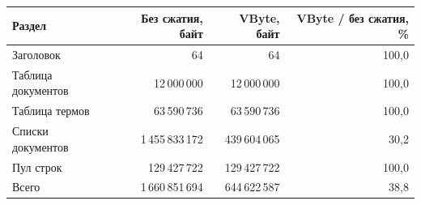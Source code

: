\begin{tabular}{|l|r|r|r|}
\hline
Раздел & Без сжатия, байт & VByte, байт & VByte / без сжатия, \% \\
\hline
Заголовок & 64 & 64 & 100,0 \\
\hline
Таблица документов & 12\,000\,000 & 12\,000\,000 & 100,0 \\
\hline
Таблица термов & 63\,590\,736 & 63\,590\,736 & 100,0 \\
\hline
Списки документов & 1\,455\,833\,172 & 439\,604\,065 & 30,2 \\
\hline
Пул строк & 129\,427\,722 & 129\,427\,722 & 100,0 \\
\hline
Всего & 1\,660\,851\,694 & 644\,622\,587 & 38,8 \\
\hline
\end{tabular}
